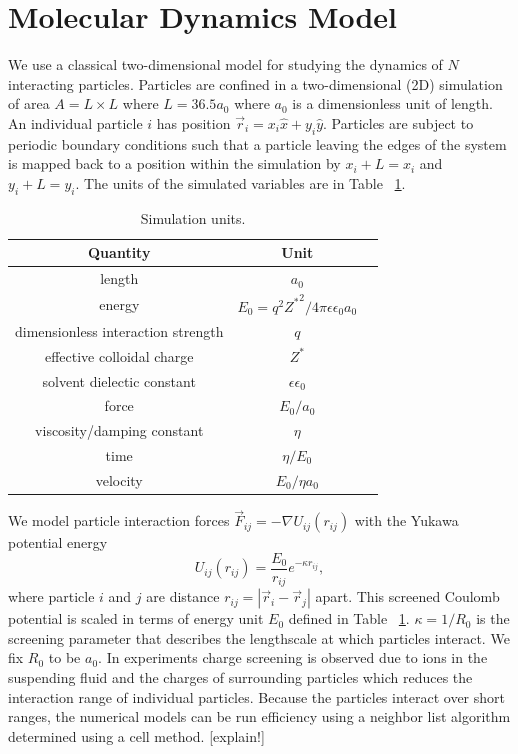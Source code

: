 \documentclass[twocolumn,preprintnumbers,amsmath,amssymb,aps,prx]{revtex4}
\begin{document}

\section{Molecular Dynamics Model}
\label{sec:MD}
We use a classical two-dimensional model for 
studying the dynamics of $N$ interacting particles. 
Particles are confined in a two-dimensional (2D) 
simulation of area $A = L \times L$ where $L=36.5 a_0$
where $a_0$ is a dimensionless unit of length.
An individual particle $i$ has
position $\vec{r}_i = x_i \hat{x} + y_i \hat{y}$.
Particles are subject to
periodic boundary conditions
such that a particle leaving the edges of the system is mapped
back to a position within the simulation 
by $x_i+L=x_i$ and $y_i+L=y_i$.
The units of the simulated variables are in Table ~\ref{tab:1}.

\begin{table}[h!]
\centering
\caption{Simulation units.}
\begin{ruledtabular}
\begin{tabular}{c c p{5cm}}
Quantity & Unit \\
\hline
length &  $a_0$ \\
energy & $E_0 = q^2{Z^*}^2/4\pi \epsilon \epsilon_0 a_0$ \\
dimensionless interaction strength & $q$ \\
effective colloidal charge & $Z^*$ \\
solvent dielectic constant & $\epsilon \epsilon_0$\\
force & $E_0 / a_0$\\
viscosity/damping constant & $\eta$ \\
time &  $\eta / E_0$ \\
velocity &  $ E_0 / \eta a_0$ \\
\end{tabular}
\end{ruledtabular}
\label{tab:1}
\end{table}

We model particle interaction forces
$\vec{F}_{ij} = -\nabla U_{ij}(r_{ij})$ 
with
the Yukawa potential energy 
\begin{equation}
  U_{ij}(r_{ij}) = \frac{E_0}{r_{ij}} e^{-\kappa r_{ij}},
\end{equation}
where particle $i$ and $j$ are distance
$r_{ij} = |\vec{r}_i - \vec{r}_j|$ apart.
This 
screened Coulomb potential
is scaled in terms of energy unit $E_0$
defined in Table ~\ref{tab:1}.
$\kappa = 1/R_0$ is the screening parameter 
that describes the lengthscale at
which particles interact.
We fix $R_0$ to be $a_0$.
In experiments charge screening is observed
due to ions in the suspending fluid and
the charges of surrounding particles
which
reduces the interaction range of individual particles. %
Because the particles interact over short ranges, 
the numerical models can be run efficiency
using a neighbor list algorithm
determined using a cell method.
[explain!]
\end{document}
